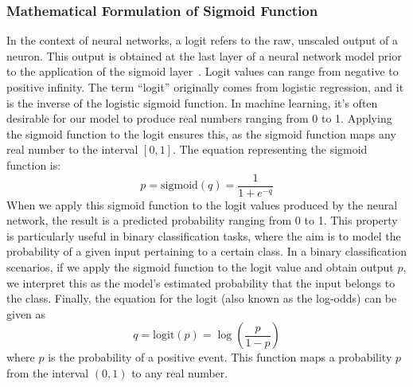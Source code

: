 \documentclass[final,1p,times,authoryear]{elsarticle}
\begin{document}
\subsubsection{Mathematical Formulation of Sigmoid Function}
In the context of neural networks, a logit refers to the raw, unscaled output of a neuron. This output is obtained at the last layer of a neural network model prior to the application of the sigmoid layer~\cite{furnieles_Sigmoid_2022}. Logit values can range from negative to positive infinity. The term ``logit'' originally comes from logistic regression, and it is the inverse of the logistic sigmoid function. In machine learning, it's often desirable for our model to produce real numbers ranging from 0 to 1. Applying the sigmoid function to the logit ensures this, as the sigmoid function maps any real number to the interval \([0,1]\).
The equation representing the sigmoid function is:
\begin{equation}
    p = \text{{sigmoid}}(q) = \frac{1}{1 + e^{-q}}
\end{equation}
When we apply this sigmoid function to the logit values produced by the neural network, the result is a predicted probability ranging from 0 to 1. This property is particularly useful in binary classification tasks, where the aim is to model the probability of a given input pertaining to a certain class.
In a binary classification scenarios, if we apply the sigmoid function to the logit value and obtain output \( p \), we interpret this as the model's estimated probability that the input belongs to the class.
Finally, the equation for the logit (also known as the log-odds) can be given as
\begin{equation}
    q = \text{{logit}}(p) = \log \left( \frac{p}{1 - p} \right)
\end{equation}
where \( p \) is the probability of a positive event. This function maps a probability \( p \) from the interval \((0,1)\) to any real number.
\end{document}
